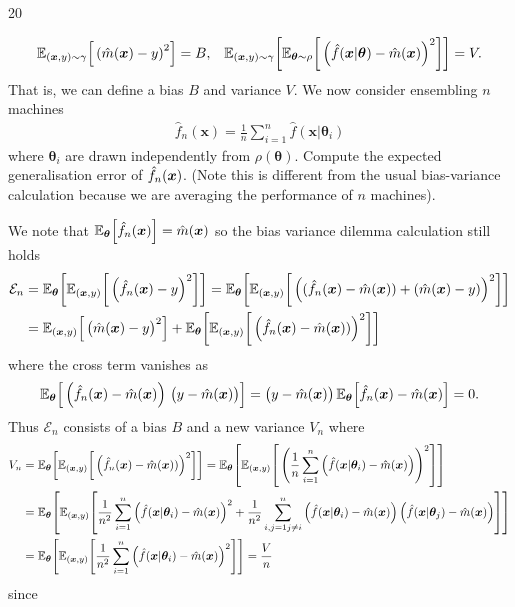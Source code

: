\documentclass{sotonExamBoxes}    %
\newcommand{\ml}[1]{\hat{f}(\bm{x}|\bm{\theta}_{#1})}
\newcommand{\mm}{\hat{m}(\bm{x})}
\begin{document}
\begin{question}{20}
\begin{qparts}
{\begin{align*}
        \av[(\bm{x},y)\sim\gamma]{\bra{\mm-y}^2} &= B,
        &
        \av[(\bm{x},y)\sim\gamma]{\av[\bm{\theta}\sim\rho]{\bra{\ml{}-\mm}^2}}
          = V.
      \end{align*}
      That is, we can define a bias $B$ and variance $V$.  We now
      consider ensembling $n$ machines
      \begin{align*}
        \hat{f}_n(\bm{x}) = \frac{1}{n} \sum_{i=1}^n \ml{i}
      \end{align*}
      where $\bm{\theta}_i$ are drawn independently from
      $\rho(\bm{\theta})$.  Compute the expected generalisation
      error of $\hat{f}_n(\bm{x})$. (Note this is different from the usual
      bias-variance calculation because we are averaging the
      performance of $n$ machines).
    }{}
    \begin{answer}
      We note that $\av[\bm{\theta}]{\mln} = \mm$ so the bias
      variance dilemma calculation still holds
      \begin{align*}
        \mathcal{E}_n
        &= \av[\bm{\theta}]{\av[(\bm{x}, y)]{\bra{\mln-y}^2}}
          = \av[\bm{\theta}]{\av[(\bm{x}, y)]{\bra{(\mln-\mm) +
          (\mm-y)}^2}}
        \\
          &= \av[(\bm{x}, y)]{\bra{\strut \mm-y}^2}
          + \av[\bm{\theta}]{\av[(\bm{x}, y)]{\bra{\mln-\mm)}^2}}
      \end{align*}
      where the cross term vanishes as
      \begin{align*}
        \av[\bm{\theta}]{\bra{\mln-\mm}\,\bra{\strut y-\mm}}
        = \bra{\strut y-\mm} \av[\bm{\theta}]{\mln-\mm} = 0.
      \end{align*}
      Thus $\mathcal{E}_n$ consists of a bias $B$ and a new variance
      $V_n$ where
      \begin{align*}
        V_n &=\av[\bm{\theta}]{\av[(\bm{x}, y)]{\bra{\mln-\mm)}^2}} =
              \av[\bm{\theta}]{\av[(\bm{x},y)]{\bra{\frac{1}{n}\sum_{i=1}^n
              \bra{\ml{i}-\mm}}^2}}
        \\
        &= \av[\bm{\theta}]{\av[(\bm{x},y)]{\frac{1}{n^2}\sum_{i=1}^n \bra{\ml{i}-\mm}^2
          + \frac{1}{n^2}\sum_{\substack{i,j=1}{j\neq i}}^n
          \bra{\ml{i}-\mm}\bra{\ml{j}-\mm }}}
        \\
            &=
              \av[\bm{\theta}]{\av[(\bm{x},y)]{\frac{1}{n^2}\sum_{i=1}^n
              \bra{\ml{i}-\mm}^2}} = \frac{V}{n}
      \end{align*}
      since
      \begin{align*}

\end{align*}
\end{answer}
\end{qparts}
\end{question}
\end{document}
